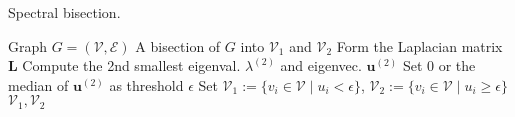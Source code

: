 \begin{algorithm}
    \caption{Spectral bisection.}
    \label{alg:spec}
    \begin{algorithmic}[1]
        \Require Graph \( G = (\mathcal{V}, \mathcal{E}) \)
    \Ensure A bisection of \( G \) into \(\mathcal{V}_1\) and \(\mathcal{V}_2\)
        \State Form the Laplacian matrix \(\mathbf{L}\)
        \State Compute the 2nd smallest eigenval. \(\lambda^{(2)}\) and eigenvec. \(\mathbf{u}^{(2)}\)
        \State Set 0 or the median of \(\mathbf{u}^{(2)}\) as threshold \(\epsilon\)
        \State Set \(\mathcal{V}_1 := \{v_i \in \mathcal{V} \mid u_i< \epsilon\}\), \(\mathcal{V}_2 := \{v_i \in \mathcal{V} \mid u_i \geq \epsilon\}\)
        \State \Return \(\mathcal{V}_1, \mathcal{V}_2\)
    \EndFunction
    \end{algorithmic}
\end{algorithm}